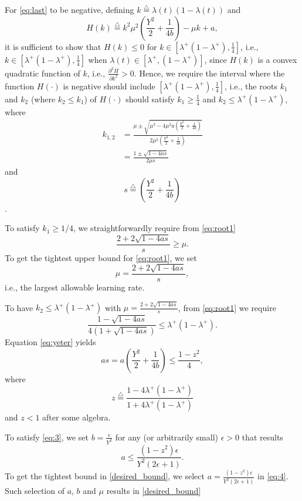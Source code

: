 \documentclass[journal]{IEEEtran}
\newcommand{\be}{\begin{equation}}
\newcommand{\ee}{\end{equation}}
\newcommand{\nn}{\nonumber}
\newcommand{\lp}{\lambda^+}
\newcommand{\defi}{\stackrel{\bigtriangleup}{=}}
\begin{document}
For \eqref{eq:last} to be negative, defining $k \defi \lambda(t) (1-
\lambda(t))$ and
\[
H(k) \defi k^2 \mu^2 (\frac{Y^2}{2} + \frac{1}{4b}) -
\mu k + a,
\]\normalsize
it is sufficient to show that $H(k) \leq 0$ for $k \in [\lp (1-\lp) ,
  \frac{1}{4}]$, i.e., $ k \in [\lp (1-\lp) , \frac{1}{4}]$ when
$\lambda(t) \in [\lp,(1-\lp)]$, since $H(k)$ is a convex quadratic
function of $k$, i.e., $\frac{\partial^2 H}{\partial k^2} > 0$. Hence,
we require the interval where the function $H(\cdot)$ is negative
should include $[\lp(1-\lp),\frac{1}{4}]$, i.e., the roots $k_1$ and
$k_2$ (where $k_2 \leq k_1$) of $H(\cdot)$ should satisfy $k_1 \geq
\frac{1}{4}$ and $k_2 \leq \lp(1-\lp)$, where
\begin{align}
k_{1,2} & = \frac{\mu \pm \sqrt{{\mu}^2 - 4 {\mu}^2 a \left(\frac{Y^2}{2} + \frac{1}{4b}\right)}}{2{\mu}^2 (\frac{Y^2}{2} + \frac{1}{4b})} \nn \\
& = \frac{1 \pm \sqrt{1 - 4  a s}}{2\mu s}\label{eq:root1}
\end{align}and \[s \defi \left(\frac{Y^2}{2} + \frac{1}{4b}\right)\].


To satisfy $k_1 \geq 1/4$, we straightforwardly require from \eqref{eq:root1}
\[
\frac{2+2 \sqrt{1-4as}}{s} \geq
\mu.
\]\normalsize
To get the tightest upper bound for \eqref{eq:root1}, we set
\[
\mu = \frac{2+2 \sqrt{1-4as}}{s},
\]\normalsize
i.e., the largest allowable learning rate.

To have $k_2 \leq
\lambda^+(1-\lambda^+)$ with $\mu = \frac{2+2 \sqrt{1-4as}}{s}$, from
\eqref{eq:root1} we require \be
\frac{1-\sqrt{1-4as}}{4(1+\sqrt{1-4as})} \leq
\lambda^+(1-\lambda^+). \label{eq:yeter} \ee Equation \eqref{eq:yeter}
yields
\begin{equation}
as= a \left(\frac{Y^2}{2} + \frac{1}{4b}\right) \leq \frac{1- z^2}{4}, \label{eq:3}
\end{equation}\normalsize
where
\[
z \defi \frac{1-4 \lambda^+(1-\lambda^+)}{1+4
  \lambda^+(1-\lambda^+)}
\]\normalsize
and $z < 1$ after some algebra.


To satisfy \eqref{eq:3}, we set $b = \frac{\epsilon}{Y^2}$ for any (or
arbitrarily small) $\epsilon > 0$ that results
\begin{equation}
a \leq \frac{(1-z^2) \epsilon}{Y^2 (2\epsilon+1)}. \label{eq:4}
\end{equation}\normalsize
To get the tightest bound in \eqref{desired_bound}, we select $a =
\frac{(1-z^2) \epsilon}{Y^2 (2\epsilon+1)}$ in \eqref{eq:4}. Such
selection of $a$, $b$ and $\mu$ results in \eqref{desired_bound}
\end{document}
